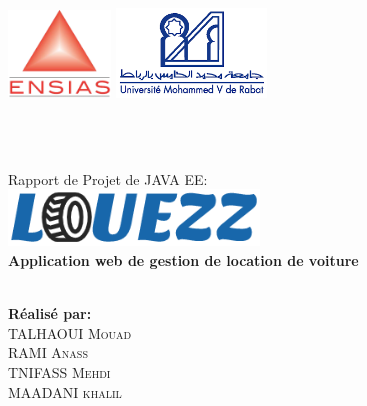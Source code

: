 \begin{titlepage}
	\vspace{0.8cm}
	\includegraphics[width=0.205\textwidth,left=5cm]{ensias.png}
	\hspace{8cm}
	\includegraphics[width=0.3\textwidth, right=25cm]{um5.png}
\begin{center}



\textsc{\Large }\\[0.5cm]

	\vspace{2cm}	


	\LARGE
		\HRule\\[0.4cm]

	Rapport de Projet de JAVA EE:\\
	\vspace{1cm}
	\LARGE
		\includegraphics[width=0.5\textwidth, right=20cm]{logo.png}\\
    \vspace{1cm}
    \textbf{Application web de gestion de location de voiture}	\\
		
	\HRule\\[3cm]




\begin{minipage}{0.4\textwidth}
\begin{flushleft} \large
\textbf{Réalisé par:}\\
\vspace{0.8cm}
TALHAOUI \textsc{Mouad}\\
RAMI \textsc{Anass}\\
TNIFASS \textsc{Mehdi}\\
MAADANI \textsc{khalil}\\


\end{flushleft}
\end{minipage}
\end{center}
\end{titlepage}
